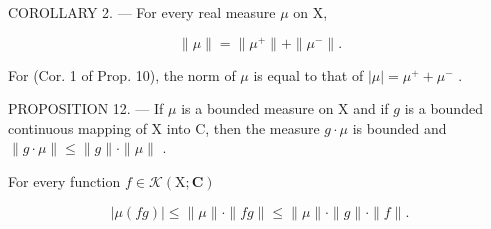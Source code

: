 COROLLARY 2. --- For every real measure \(\mu\) on X,

\[
\| \mu \| = \| \mu^ {+} \| + \| \mu^ {-} \|.
\]

For (Cor. 1 of Prop. 10), the norm of \(\mu\) is equal to that of \(|\mu| = \mu^{+} + \mu^{-}\) .

PROPOSITION 12. --- If \(\mu\) is a bounded measure on X and if \(g\) is a bounded continuous mapping of X into C, then the measure \(g \cdot \mu\) is bounded and \(\| g \cdot \mu \| \leqslant \| g \| \cdot \| \mu \|\) .

For every function \(f\in \mathcal{K}(\mathrm{X};\mathbf{C})\)

\[
| \mu (f g) | \leqslant \| \mu \| \cdot \| f g \| \leqslant \| \mu \| \cdot \| g \| \cdot \| f \|.
\]

